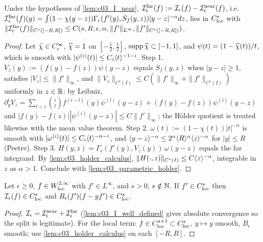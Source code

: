 \begin{lemma}
  \label{lem:c03_I_far}
  Under the hypotheses of \cref{lem:c03_I_near}, $\mathcal{I}^{\textup{far}}_\epsilon(f):=\mathcal{I}_\epsilon(f)-\mathcal{I}^{\textup{near}}_\epsilon(f)$, i.e.
  $\mathcal{I}^{\textup{far}}_\epsilon(f)(y)=\int(1-\chi(y-z))\Gamma_\epsilon(f'(y),S_f(y,z))|y-z|^{-\alpha}dz$, lies in $C^s_{\textup{loc}}$
  with $\|\mathcal{I}^{\textup{far}}_\epsilon(f)\|_{C^s([-R,R])}\le C(s,R,\epsilon,\alpha,\|f'\|_{L^\infty},\|f'\|_{C^s([-R,R])})$.
\end{lemma}
\begin{proof}
  Let $\widetilde{\chi}\in C_c^\infty$, $\widetilde{\chi}=1$ on $[-\frac12,\frac12]$, $\operatorname{supp}\widetilde{\chi}\subset[-1,1]$, and $\psi(t)=(1-\widetilde{\chi}(t))/t$, which is smooth with $|\psi^{(i)}(t)|\le C_i\langle t \rangle^{-1-i}$.
  Step 1. $V_z(y):=(f(y)-f(z))\psi(y-z)$ equals $S_f(y,z)$ when $|y-z|\ge1$, satisfies $|V_z|\le\|f'\|_\infty$, and
  $\|V_z\|_{C^s(I)}\le C(\|f'\|_\infty+\|f'\|_{C^s(I)})$ uniformly in $z\in\mathbb{R}$: by Leibniz,
  $\partial_y^iV_z=\sum_{l<i}\binom il f^{(i-l)}(y)\psi^{(l)}(y-z)+(f(y)-f(z))\psi^{(i)}(y-z)$ and $|f(y)-f(z)||\psi^{(i)}(y-z)|\le C\|f'\|_\infty$; the H\"older quotient is treated likewise with the mean value theorem.
  Step 2. $\omega(t):=(1-\chi(t))|t|^{-\alpha}$ is smooth with $|\omega^{(i)}(t)|\le C_i\langle t \rangle^{-\alpha-i}$, and $\langle y-z \rangle^{-\alpha}\le 2^{\alpha}\langle R \rangle^{\alpha}\langle z \rangle^{-\alpha}$ for $|y|\le R$ (Peetre).
  Step 3. $H(y,z)=\Gamma_\epsilon(f'(y),V_z(y))\,\omega(y-z)$ equals the far integrand. By \cref{lem:c03_holder_calculus}, $\|H(\cdot,z)\|_{C^s(I)}\le C\langle z \rangle^{-\alpha}$, integrable in $z$ as $\alpha>1$. Conclude with \cref{lem:c03_parametric_holder}.
\end{proof}

\begin{lemma}
  \label{lem:c03_I_regularity}
  Let $\epsilon\ge0$, $f\in W^{2,\infty}_{\textup{loc}}$ with $f'\in L^\infty$, and $s>0$, $s\notin\mathbb{N}$. If $f'\in C^s_{\textup{loc}}$ then
  $\mathcal{I}_\epsilon(f)\in C^s_{\textup{loc}}$ and $B_\epsilon(f')(f-yf')\in C^s_{\textup{loc}}$.
\end{lemma}
\begin{proof}
  $\mathcal{I}_\epsilon=\mathcal{I}^{\textup{near}}_\epsilon+\mathcal{I}^{\textup{far}}_\epsilon$ (\cref{lem:c03_I_well_defined} gives absolute convergence so the split is legitimate). For the local term: $f\in C^{s+1}_{\textup{loc}}\subset C^s_{\textup{loc}}$, $y\mapsto y$ smooth, $B_\epsilon$ smooth; use \cref{lem:c03_holder_calculus} on each $[-R,R]$.
\end{proof}

